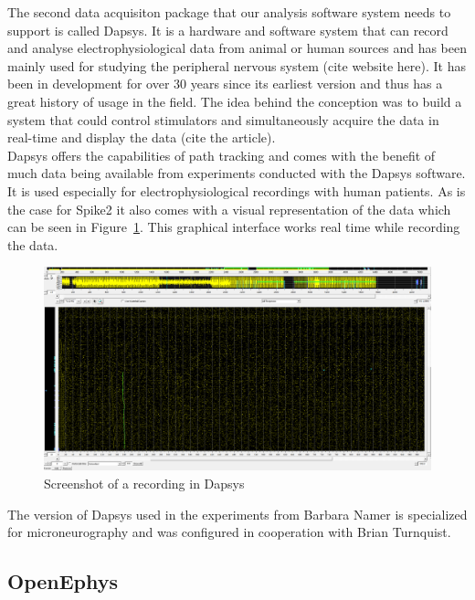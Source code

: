 The second data acquisiton package that our analysis software system needs to support is called Dapsys. It is a hardware and software system that can record and analyse electrophysiological data from animal or human sources and has been mainly used for studying the peripheral nervous system (cite website here). It has been in development for over 30 years since its earliest version and thus has a great history of usage in the field. The idea behind the conception was to build a system that could control stimulators and simultaneously acquire the data in real-time and display the data (cite the article).\\
Dapsys offers the capabilities of path tracking and comes with the benefit of much data being available from experiments conducted with the Dapsys software. It is used especially for electrophysiological recordings with human patients. As is the case for Spike2 it also comes with a visual representation of the data which can be seen in Figure~\ref{fig:dapsys}. This graphical interface works real time while recording the data.\\
\begin{figure}
	\includegraphics[width = \textwidth]{src/pic/Dapsys_sc}
	\caption{Screenshot of a recording in Dapsys}
	\label{fig:dapsys}
\end{figure}
The version of Dapsys used in the experiments from Barbara Namer is specialized for microneurography and was configured in cooperation with Brian Turnquist.\\


\subsection{OpenEphys}

